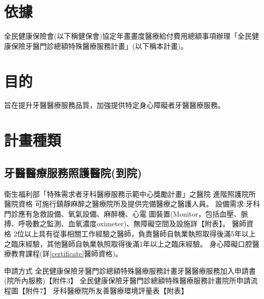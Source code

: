 \section{依據}
全民健康保險會(以下稱健保會)協定年畫畫度醫療給付費用總額事項辦理「全民健康保險牙醫門診總額特殊醫療服務計畫」(以下稱本計畫)。

\section{目的} 旨在提升牙醫醫療服務品質，加強提供特定身心障礙者牙醫醫療服務。

\section{計畫種類}

\subsection{牙醫醫療服務照護醫院(到院)}
\begin{outline}

\1 衛生福利部「特殊需求者牙科醫療服務示範中心獎勵計畫」之醫院 
\1 進階照護院所
\2 醫院資格
    \3 可施行鎮靜麻醉之醫療院所及提供完備醫療之醫護人員。
    \3 設備需求:牙科門診應有急救設備、氧氣設備、麻醉機、心電 圖裝置(Monitor，包括血壓、脈搏、呼吸數之監測、血氧濃度oximeter)、無障礙空間及設施詳【附表】。
\2 醫師資格
    \3 2位以上具有從事相關工作經驗之醫師，負責醫師自執業執照取得後滿5年以上之臨床經驗，其他醫師自執業執照取得後滿1年以上之臨床經驗。
    \3 身心障礙口腔醫療教育課程(詳\ref{certificate}醫師資格)。

\0 申請方式
\1 全民健康保險牙醫門診總額特殊醫療服務計畫牙醫醫療服務加入申請書(院所內服務)【附件3】
\1 全民健康保險牙醫門診總額特殊醫療服務計畫院所申請流程圖【附件7】
\1 牙科醫療院所友善醫療環境評量表【附表】

\end{outline}


